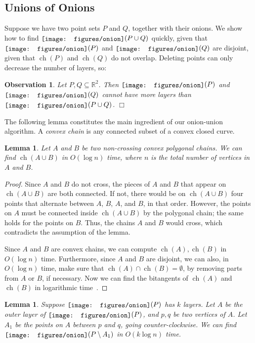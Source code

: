 \documentclass{paper}
\newcommand {\R} {\mathbb {R}}
\DeclareMathOperator{\ch}{ch}
\newcommand {\onion} {\raisebox{-0.25ex}{\texttt{[image: figures/onion]}}}
\newtheorem{lemma}[theorem]{Lemma}
\newtheorem{obs}[theorem]{Observation}
\begin{document}
\subsection {Unions of Onions}

Suppose we have two point sets $P$ and $Q$, together with their onions. 
We show how to find $\onion(P \cup Q)$ quickly, given that $\onion(P)$
and $\onion(Q)$ are disjoint, given that $\ch(P)$ and $\ch(Q)$ do not overlap.
Deleting points can only decrease
the number of layers, so:

\begin {obs} \label {obs:k}
  Let $P, Q \subseteq \R^2$. 
  Then $\onion(P)$ and $\onion(Q)$ cannot have more layers than 
  $\onion(P \cup Q)$. \hfill$\Box$
\end {obs}

The following lemma constitutes the main ingredient of our onion-union 
algorithm.  A \emph{convex chain} is any connected subset 
of a convex closed curve. 

\begin{lemma} \label{lem:chainhull}
  Let $A$ and $B$ be two non-crossing convex polygonal chains. We can find 
  $\ch(A \cup B)$ in $O (\log n)$ time, where $n$ is the total number
  of vertices in $A$ and $B$.
\end{lemma}

\begin{proof}
  Since $A$ and $B$ do not cross, the pieces of $A$ and $B$ that appear on 
  $\ch(A \cup B)$ are both connected. If not, there would be on $\ch(A \cup B)$ 
  four points that alternate between $A$, $B$, $A$, and $B$, in that order. 
  However, the points on $A$ must be connected inside $\ch(A \cup B)$ by
  the polygonal chain; 
  the same holds for the points on $B$. Thus, the chains $A$ and $B$ would cross, which 
  contradicts the assumption of the lemma. 

  Since $A$ and $B$ are convex chains, we can compute
  $\ch(A), \ch(B)$ in $O(\log n)$ time. Furthermore, since $A$ and $B$
  are disjoint, we can also, in $O(\log n)$ time, make sure that
  $\ch(A) \cap \ch(B) = \emptyset$, by removing parts from $A$ or $B$,
  if necessary.
  Now we can 
  find the bitangents of $\ch(A)$ and $\ch(B)$ in 
  logarithmic time~\cite {ks-cctws-95}.
\end{proof}

\begin{lemma} \label{lem:restore}
  Suppose $\onion(P)$ has $k$ layers. Let $A$ be the outer layer of
  $\onion(P)$, and $p, q$ be two vertices of $A$. 
  Let $A_1$ be the points on $A$ between $p$ and $q$, going counter-clockwise. 
  We can find 
  $\onion (P \setminus A_1)$ in $O (k \log n)$ time.
\end{lemma}
\end{document}
